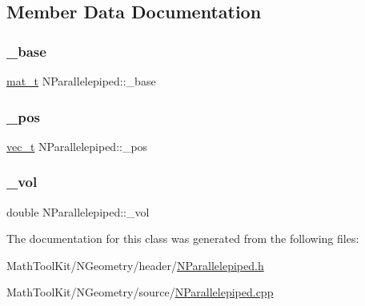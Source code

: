 \subsection{Member Data Documentation}
\mbox{\label{class_n_parallelepiped_a02542ae7d5e1d052412eb06a292e0e9d}} 
\subsubsection{\texorpdfstring{\_base}{\_base}}
{\footnotesize\ttfamily \mbox{\hyperlink{group___n_algebra_ga44dfb60c1e03b44e98a332fb2ae71947}{mat\+\_\+t}} N\+Parallelepiped\+::\+\_\+base\hspace{0.3cm}{\ttfamily [protected]}}

\mbox{\label{class_n_parallelepiped_ae1cc22beb853095d8a110c641dd8e005}} 
\subsubsection{\texorpdfstring{\_pos}{\_pos}}
{\footnotesize\ttfamily \mbox{\hyperlink{group___n_algebra_ga0a2cfc67e738a3d73e4f12098c4c07f6}{vec\+\_\+t}} N\+Parallelepiped\+::\+\_\+pos\hspace{0.3cm}{\ttfamily [protected]}}

\mbox{\label{class_n_parallelepiped_aabd33c4ffeff864ea342440c08d4702b}} 
\subsubsection{\texorpdfstring{\_vol}{\_vol}}
{\footnotesize\ttfamily double N\+Parallelepiped\+::\+\_\+vol\hspace{0.3cm}{\ttfamily [protected]}}



The documentation for this class was generated from the following files\+:\begin{DoxyCompactItemize}
\item 
Math\+Tool\+Kit/\+N\+Geometry/header/\mbox{\hyperlink{_n_parallelepiped_8h}{N\+Parallelepiped.\+h}}\item 
Math\+Tool\+Kit/\+N\+Geometry/source/\mbox{\hyperlink{_n_parallelepiped_8cpp}{N\+Parallelepiped.\+cpp}}\end{DoxyCompactItemize}
